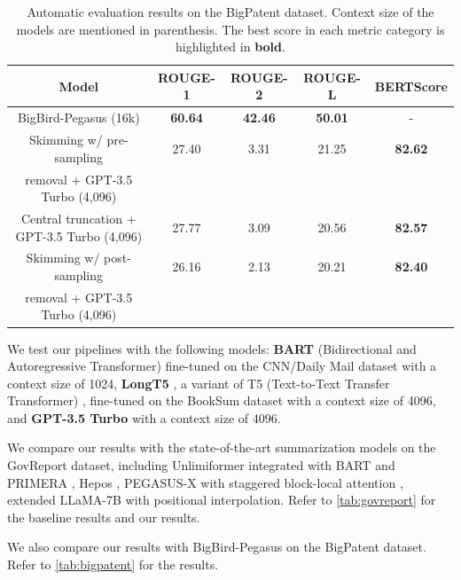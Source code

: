	\begin{table}[!ht]
		\centering

		\begin{tabular}{c c c c c}
			\hline
			Model & ROUGE-1 & ROUGE-2 & ROUGE-L & BERTScore \\
			\hline
			BigBird-Pegasus (16k) & \textbf{60.64} & \textbf{42.46} & \textbf{50.01} & - \\
			\hline
			Skimming w/ pre-sampling & 27.40 & 3.31 & 21.25 & \textbf{82.62} \\
			removal + GPT-3.5 Turbo (4,096) & & & & \\
			Central truncation + GPT-3.5 Turbo (4,096) & 27.77 & 3.09 & 20.56 & \textbf{82.57} \\
			Skimming w/ post-sampling & 26.16 & 2.13 & 20.21 & \textbf{82.40} \\
			removal + GPT-3.5 Turbo (4,096) & & & & \\
			\hline
		\end{tabular}

		\caption{Automatic evaluation results on the BigPatent dataset. Context size of
		the models are mentioned in parenthesis. The best score in each metric category
		is highlighted in \textbf{bold}.}
		\label{tab:bigpatent}
	\end{table}

	We test our pipelines with the following models: \textbf{BART} (Bidirectional
	and Autoregressive Transformer) \cite{lewis-etal-2020-bart} fine-tuned on the
	CNN/Daily Mail dataset \cite{nallapati2016abstractive} with a context size of 1024,
	\textbf{LongT5} \cite{guo2021longt5}, a variant of T5 (Text-to-Text Transfer
	Transformer) \cite{raffel2020exploring}, fine-tuned on the BookSum dataset with
	a context size of 4096, and \textbf{GPT-3.5 Turbo} \cite{brown2020language} with a
	context size of 4096.

	We compare our results with the state-of-the-art summarization models on the GovReport dataset,
	including Unlimiformer \cite{bertsch2023unlimiformer} integrated with BART
	\cite{lewis-etal-2020-bart} and PRIMERA \cite{beltagy2020longformer}, Hepos
	\cite{huang-etal-2021-efficient}, PEGASUS-X with staggered block-local attention
	\cite{phang2022investigating}, extended	LLaMA-7B with positional interpolation.
	Refer to \autoref{tab:govreport} for the baseline results and our results.

	We also compare our results with BigBird-Pegasus \cite{zaheer2020big} on the BigPatent dataset.
	Refer to \autoref{tab:bigpatent} for the results.


